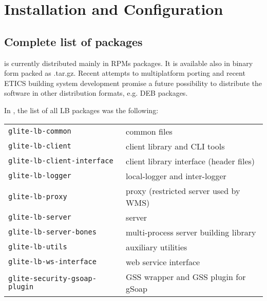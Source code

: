 %
%
\section{Installation and Configuration}

\subsection{Complete list of packages}

\LB is currently distributed mainly in RPMs packages. It is available also in
binary form packed as .tar.gz. Recent attempts to multiplatform porting and
recent ETICS building system development promise a future possibility to
distribute the software in other distribution formats, e.g. DEB packages. 

In \LBold, the list of all LB packages was the following:

\begin{tabularx}{\textwidth}{>{\tt}lX}
glite-lb-common & common files \\ 
glite-lb-client & client library and CLI tools\\ 
glite-lb-client-interface & client library interface (header files) \\ 
glite-lb-logger & local-logger and inter-logger \\ 
glite-lb-proxy & proxy (restricted server used by WMS)\\ 
glite-lb-server & server \\ 
glite-lb-server-bones & multi-process server building library \\ 
glite-lb-utils & auxiliary utilities \\ 
glite-lb-ws-interface & web service interface  \\
glite-security-gsoap-plugin & GSS wrapper and GSS plugin for gSoap
\end{tabularx}

